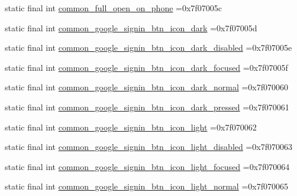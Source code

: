 \begin{DoxyCompactItemize}
\item 
static final int \mbox{\hyperlink{classbr_1_1unb_1_1cic_1_1mp_1_1marketmaster_1_1R_1_1drawable_a081a6ec3cf9ab264e6dd34dcd6a96b03}{common\+\_\+full\+\_\+open\+\_\+on\+\_\+phone}} =0x7f07005c
\item 
static final int \mbox{\hyperlink{classbr_1_1unb_1_1cic_1_1mp_1_1marketmaster_1_1R_1_1drawable_aa537a763078683bc93ba0414e839e55c}{common\+\_\+google\+\_\+signin\+\_\+btn\+\_\+icon\+\_\+dark}} =0x7f07005d
\item 
static final int \mbox{\hyperlink{classbr_1_1unb_1_1cic_1_1mp_1_1marketmaster_1_1R_1_1drawable_a8f5d79ea9957a93a89f929179b321f2e}{common\+\_\+google\+\_\+signin\+\_\+btn\+\_\+icon\+\_\+dark\+\_\+disabled}} =0x7f07005e
\item 
static final int \mbox{\hyperlink{classbr_1_1unb_1_1cic_1_1mp_1_1marketmaster_1_1R_1_1drawable_a801bcc70f2708e01dbd4386612e63406}{common\+\_\+google\+\_\+signin\+\_\+btn\+\_\+icon\+\_\+dark\+\_\+focused}} =0x7f07005f
\item 
static final int \mbox{\hyperlink{classbr_1_1unb_1_1cic_1_1mp_1_1marketmaster_1_1R_1_1drawable_a00f5d13d62878211747ce32e9e8f76bf}{common\+\_\+google\+\_\+signin\+\_\+btn\+\_\+icon\+\_\+dark\+\_\+normal}} =0x7f070060
\item 
static final int \mbox{\hyperlink{classbr_1_1unb_1_1cic_1_1mp_1_1marketmaster_1_1R_1_1drawable_a5297d8a7e89758e5defa75c46f03f520}{common\+\_\+google\+\_\+signin\+\_\+btn\+\_\+icon\+\_\+dark\+\_\+pressed}} =0x7f070061
\item 
static final int \mbox{\hyperlink{classbr_1_1unb_1_1cic_1_1mp_1_1marketmaster_1_1R_1_1drawable_ac3f0ba2c5bbe3276f86115aa9740f192}{common\+\_\+google\+\_\+signin\+\_\+btn\+\_\+icon\+\_\+light}} =0x7f070062
\item 
static final int \mbox{\hyperlink{classbr_1_1unb_1_1cic_1_1mp_1_1marketmaster_1_1R_1_1drawable_a06695d1b994487d0c2a90307c5d35c44}{common\+\_\+google\+\_\+signin\+\_\+btn\+\_\+icon\+\_\+light\+\_\+disabled}} =0x7f070063
\item 
static final int \mbox{\hyperlink{classbr_1_1unb_1_1cic_1_1mp_1_1marketmaster_1_1R_1_1drawable_ad0c08a8167c80c37dc87809702ec9623}{common\+\_\+google\+\_\+signin\+\_\+btn\+\_\+icon\+\_\+light\+\_\+focused}} =0x7f070064
\item 
static final int \mbox{\hyperlink{classbr_1_1unb_1_1cic_1_1mp_1_1marketmaster_1_1R_1_1drawable_a1c47af461d09255b3c088359716adf26}{common\+\_\+google\+\_\+signin\+\_\+btn\+\_\+icon\+\_\+light\+\_\+normal}} =0x7f070065
\item 

\end{DoxyCompactItemize}
